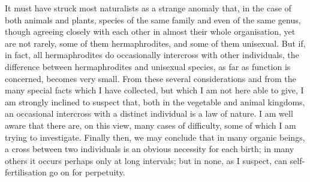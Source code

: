 It must have struck most naturalists as a strange anomaly that, in the case of both animals and plants, species of the same family and even of the same genus, though agreeing closely with each other in almost their whole organisation, yet are not rarely, some of them hermaphrodites, and some of them unisexual. But if, in fact, all hermaphrodites do occasionally intercross with other individuals, the difference between hermaphrodites and unisexual species, as far as function is concerned, becomes very small.
From these several considerations and from the many special facts which I have collected, but which I am not here able to give, I am strongly inclined to suspect that, both in the vegetable and animal kingdoms, an occasional intercross with a distinct individual is a law of nature. I am well aware that there are, on this view, many cases of difficulty, some of which I am trying to investigate. Finally then, we may conclude that in many organic beings, a cross between two individuals is an obvious necessity for each birth; in many others it occurs perhaps only at long intervals; but in none, as I suspect, can self-fertilisation go on for perpetuity.

